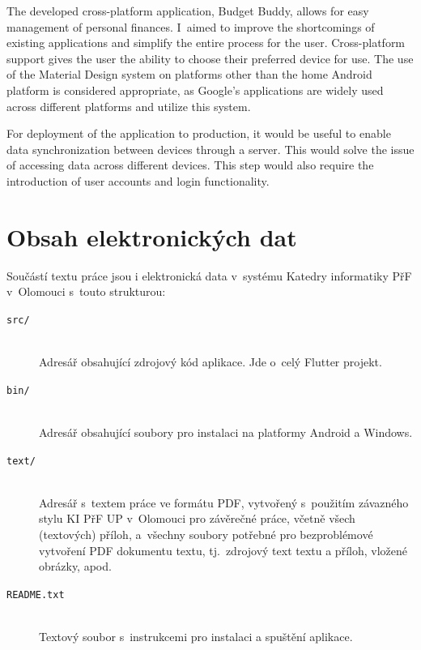 \documentclass[
  biblatex,
  figures=true,
  tables=false,
  glossaries,
  index
]{kidiplom}
\begin{document}
\begin{kiconclusions}[english]
The developed cross-platform application, Budget Buddy, allows for easy management of personal finances. I~aimed to improve the shortcomings of existing applications and simplify the entire process for the user. Cross-platform support gives the user the ability to choose their preferred device for use. The use of the Material Design system on platforms other than the home Android platform is considered appropriate, as Google’s applications are widely used across different platforms and utilize this system.

For deployment of the application to production, it would be useful to enable data synchronization between devices through a server. This would solve the issue of accessing data across different devices. This step would also require the introduction of user accounts and login functionality.
\end{kiconclusions}

\appendix
\section{Obsah elektronických dat} \label{sec:ObsahElData}
Součástí textu práce jsou i elektronická data v~systému Katedry informatiky PřF v~Olomouci s~touto strukturou:

\begin{description}

  \item[\texttt{src/}] \hfill \\
    Adresář obsahující zdrojový kód aplikace. Jde o~celý Flutter projekt.
  \item[\texttt{bin/}] \hfill \\
    Adresář obsahující soubory pro instalaci na platformy Android a Windows.
  \item[\texttt{text/}] \hfill \\
    Adresář s~textem práce ve formátu PDF, vytvořený s~použitím
    závazného stylu KI PřF UP v~Olomouci pro závěrečné práce, včetně
    všech (textových) příloh, a~všechny soubory potřebné pro
    bezproblémové vytvoření PDF dokumentu textu, tj.~zdrojový text textu a příloh, vložené obrázky, apod.
  \item[\texttt{README.txt}] \hfill \\
    Textový soubor s~instrukcemi pro instalaci a spuštění aplikace.

\end{description}
\end{document}
